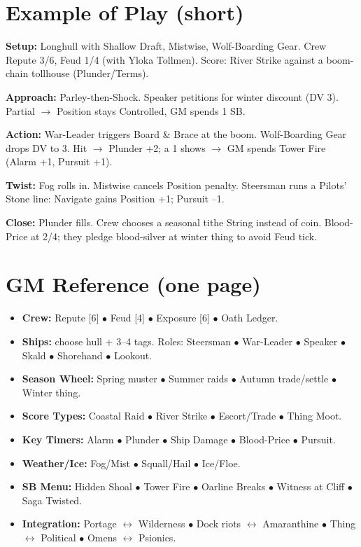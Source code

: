 \documentclass[11pt]{article}
\begin{document}
\section{Example of Play (short)}

\textbf{Setup:} Longhull with Shallow Draft, Mistwise, Wolf-Boarding Gear. Crew Repute 3/6, Feud 1/4 (with Yloka Tollmen). Score: River Strike against a boom-chain tollhouse (Plunder/Terms).

\textbf{Approach:} Parley-then-Shock. Speaker petitions for winter discount (DV 3). Partial $\rightarrow$ Position stays Controlled, GM spends 1 SB.

\textbf{Action:} War-Leader triggers Board \& Brace at the boom. Wolf-Boarding Gear drops DV to 3. Hit $\rightarrow$ Plunder +2; a 1 shows $\rightarrow$ GM spends Tower Fire (Alarm +1, Pursuit +1).

\textbf{Twist:} Fog rolls in. Mistwise cancels Position penalty. Steersman runs a Pilots' Stone line: Navigate gains Position +1; Pursuit --1.

\textbf{Close:} Plunder fills. Crew chooses a seasonal tithe String instead of coin. Blood-Price at 2/4; they pledge blood-silver at winter thing to avoid Feud tick.

\section{GM Reference (one page)}
\begin{itemize}
\item \textbf{Crew:} Repute [6] $\bullet$ Feud [4] $\bullet$ Exposure [6] $\bullet$ Oath Ledger.
\item \textbf{Ships:} choose hull + 3--4 tags. Roles: Steersman $\bullet$ War-Leader $\bullet$ Speaker $\bullet$ Skald $\bullet$ Shorehand $\bullet$ Lookout.
\item \textbf{Season Wheel:} Spring muster $\bullet$ Summer raids $\bullet$ Autumn trade/settle $\bullet$ Winter thing.
\item \textbf{Score Types:} Coastal Raid $\bullet$ River Strike $\bullet$ Escort/Trade $\bullet$ Thing Moot.
\item \textbf{Key Timers:} Alarm $\bullet$ Plunder $\bullet$ Ship Damage $\bullet$ Blood-Price $\bullet$ Pursuit.
\item \textbf{Weather/Ice:} Fog/Mist $\bullet$ Squall/Hail $\bullet$ Ice/Floe.
\item \textbf{SB Menu:} Hidden Shoal $\bullet$ Tower Fire $\bullet$ Oarline Breaks $\bullet$ Witness at Cliff $\bullet$ Saga Twisted.
\item \textbf{Integration:} Portage $\leftrightarrow$ Wilderness $\bullet$ Dock riots $\leftrightarrow$ Amaranthine $\bullet$ Thing $\leftrightarrow$ Political $\bullet$ Omens $\leftrightarrow$ Psionics.
\end{itemize}
\end{document}
